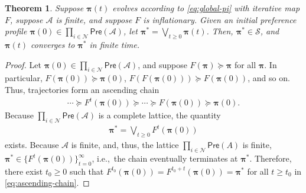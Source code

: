 \documentclass[conference]{ieeeconf}
\renewcommand{\succeq}{\succcurlyeq}
\newcommand{\N}{\mathcal{N}}
\newcommand{\A}{\mathcal{A}}
\renewcommand{\SS}{\mathcal{S}}
\newcommand{\Pref}{\mathsf{Pre}}
\newcommand{\profile}{\boldsymbol{\pi}}
\newcommand{\bigjoin}{\bigvee}
\renewcommand{\geq}{\geqslant}
\newtheorem{theorem}{Theorem}
\begin{document}
\begin{theorem} \label{theorem:constructive}
    Suppose $\profile(t)$ evolves according to \eqref{eq:global-pi} with iterative map $F$, suppose $\A$ is finite, and suppose $F$ is inflationary. Given an initial preference profile $\profile(0) \in \prod_{i \in \N} \Pref(\A)$, let $\profile^{\ast} = \bigjoin_{t \geq 0} \profile(t)$. Then, $\profile^{\ast} \in \SS$, and $\profile(t)$ converges to $\profile^{\ast}$ in finite time.
\end{theorem}
\begin{proof}
    Let $\profile(0) \in \prod_{i \in \N} \Pref(\A)$, and suppose $F(\profile) \succeq \profile$ for all $\profile$. In particular, $F\left( \profile(0) \right) \succeq \profile(0)$, $F \left( F\left( \profile(0) \right)\right) \succeq F\left( \profile(0) \right)$, and so on. Thus, trajectories form an ascending chain
    \begin{align}
        \cdots  \succeq F^t\left( \profile(0) \right) \succeq \cdots \succeq F\left( \profile(0) \right) \succeq \profile(0). \label{eq:ascending-chain}
    \end{align}
    Because $\prod_{i \in \N} \Pref(\A)$ is a complete lattice, the quantity
    \begin{align*}
        \profile^{\ast} = \bigjoin_{t \geq 0} F^t\left( \profile(0) \right)
    \end{align*}
    exists. Because $\A$ is finite, and, thus, the lattice $\prod_{i \in \N} \Pref(A)$ is finite, $\profile^{\ast} \in \{F^t\left(\profile(0) \right)\}_{t=0}^{\infty}$, i.e.,~the chain eventually terminates at $\profile^{\ast}$. Therefore, there exist $t_0 \geq 0$ such that $F^{t_0}\left(\profile(0) \right) = F^{t_0 +t}\left(\profile(0) \right) = \profile^{\ast}$ for all $t \geq t_0$ in \eqref{eq:ascending-chain}.
\end{proof}
\end{document}
